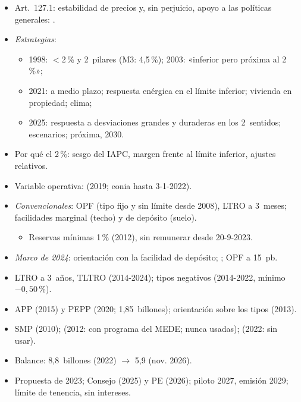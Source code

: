 \documentclass{article}
\begin{document}
\begin{columnas}
\begin{itemize}
\item Art.~127.1: estabilidad de precios y, sin perjuicio, apoyo a las políticas generales: .
\item \emph{Estrategias}:
  \begin{itemize}
  \item 1998: $<$2\,\% y 2~pilares (M3: 4,5\,\%); 2003: «inferior pero próxima al 2\,\%»;
  \item 2021:  a medio plazo; respuesta enérgica en el límite inferior; vivienda en propiedad; clima;
  \item 2025: respuesta a desviaciones grandes y duraderas en los 2~sentidos; escenarios; próxima, 2030.
  \end{itemize}
\item Por qué el 2\,\%: sesgo del IAPC, margen frente al límite inferior, ajustes relativos.
\end{itemize}

\begin{itemize}
\item Variable operativa:  (2019; eonia hasta 3-1-2022).
\item \emph{Convencionales}: OPF (tipo fijo y sin límite desde 2008), LTRO a 3~meses; facilidades marginal (techo) y de depósito (suelo).
  \begin{itemize}
  \item Reservas mínimas 1\,\% (2012), sin remunerar desde 20-9-2023.
  \end{itemize}
\item \emph{Marco de 2024}: orientación con la facilidad de depósito; ; OPF a 15~pb.
\end{itemize}
\begin{itemize}
\item LTRO a 3~años, TLTRO (2014-2024); tipos negativos (2014-2022, mínimo $-0{,}50$\,\%).
\item APP (2015) y PEPP (2020; 1,85~billones); orientación sobre los tipos (2013).
\item SMP (2010);  (2012: con programa del MEDE; nunca usadas);  (2022: sin usar).
\item Balance: 8,8~billones (2022) $\to$ 5,9 (nov. 2026).
\end{itemize}
\begin{itemize}
\item Propuesta de 2023; Consejo (2025) y PE (2026); piloto 2027, emisión 2029; límite de tenencia, sin intereses.
\end{itemize}


\end{columnas}
\end{document}
